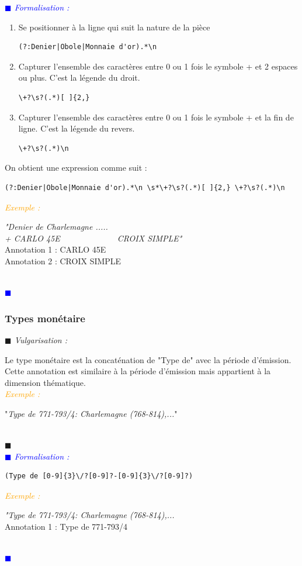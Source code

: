 \documentclass[a4paper, 11pt]{report}
\newenvironment{vulgarisation}
    {
    \textit{\textcolor{dark-blue}{$\blacksquare$  Vulgarisation : \\}}

    }
    {
    ~\\\textcolor{dark-blue}{$\blacksquare$}\\
    }
\newenvironment{formalisation}
    {
    \textit{\textcolor{blue}{$\blacksquare$  Formalisation : \\}}
    }
    {
    ~\\\textcolor{blue}{$\blacksquare$}\\
    }
\newenvironment{exemple}
    {
    \textit{\textcolor{orange}{
    Exemple : \\}}
    }
    {~\\
    }
\begin{document}
\begin{formalisation}
    \begin{enumerate}
        \item Se positionner à la ligne qui suit la nature de la pièce
              \begin{verbatim}
(?:Denier|Obole|Monnaie d'or).*\n
        \end{verbatim}
        \item Capturer l'ensemble des caractères entre 0 ou 1 fois le symbole + et 2 espaces ou plus. C'est la légende du droit.
              \begin{verbatim}
\+?\s?(.*)[ ]{2,}
        \end{verbatim}
        \item Capturer l'ensemble des caractères entre 0 ou 1 fois le symbole + et la fin de ligne. C'est la légende du revers.
              \begin{verbatim}
\+?\s?(.*)\n
        \end{verbatim}
    \end{enumerate}
    
    On obtient une expression comme suit : 
    \begin{verbatim}
(?:Denier|Obole|Monnaie d'or).*\n \s*\+?\s?(.*)[ ]{2,} \+?\s?(.*)\n
    \end{verbatim}
    
    \begin{exemple}
        \emph{"Denier de Charlemagne ..... \\+ CARLO  45E~~~~~~~~~~~~~ CROIX SIMPLE"}\\
        Annotation 1 : CARLO  45E \\
        Annotation 2 : CROIX SIMPLE
    \end{exemple}
\end{formalisation}

\subsubsection{Types monétaire}
\begin{vulgarisation}
    Le type monétaire est la concaténation de "Type de" avec la période d'émission. Cette annotation est similaire à la période d'émission mais appartient à la dimension thématique.\\
    \begin{exemple}
        "\emph{Type de 771-793/4: Charlemagne (768-814),...}"
    \end{exemple}
\end{vulgarisation}
\begin{formalisation}
    \begin{verbatim}
(Type de [0-9]{3}\/?[0-9]?-[0-9]{3}\/?[0-9]?)
    \end{verbatim}
    \begin{exemple}
        \emph{"Type de 771-793/4: Charlemagne (768-814),...}\\
        Annotation 1 : Type de 771-793/4 
    \end{exemple}
\end{formalisation}
\end{document}
